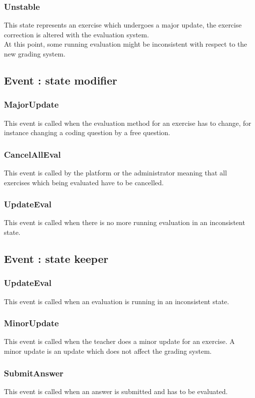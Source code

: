 		\subsubsection{Unstable}
			This state represents an exercise which undergoes a major update, the exercise correction is altered with the evaluation system.\\
			At this point, some running evaluation might be inconsistent with respect to the new grading system.
	\subsection{Event : state modifier}
		\subsubsection{MajorUpdate}
			This event is called when the evaluation method for an exercise has to change, for instance changing a coding question by a free question.
		\subsubsection{CancelAllEval}
			This event is called by the platform or the administrator meaning that all exercises which being evaluated have to be cancelled.
		\subsubsection{UpdateEval}
			This event is called when there is no more running evaluation in an inconsistent state.
	\subsection{Event : state keeper}
		\subsubsection{UpdateEval}
			This event is called when an evaluation is running in an inconsistent state.
		\subsubsection{MinorUpdate} 	
			This event is called when the teacher does a minor update for an exercise.
			A minor update is an update which does not affect the grading system.
		\subsubsection{SubmitAnswer}
			This event is called when an answer is submitted and has to be evaluated.

